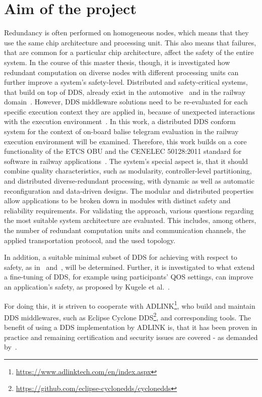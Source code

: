 \documentclass[a4paper, 12pt]{scrartcl}
\begin{document}
\section*{Aim of the project}
Redundancy is often performed on homogeneous nodes, which means that they use the same chip architecture and processing unit.
This also means that failures, that are common for a particular chip architecture, affect the safety of the entire system.
In the course of this master thesis, though, it is investigated how redundant computation on diverse nodes with different processing units can further improve a system's safety-level.
Distributed and safety-critical systems, that build on top of \ac{DDS}, already exist in the automotive~\cite{DistributedSafety2020} and in the railway domain~\cite{DDSInURail}.
However, \ac{DDS} middleware solutions need to be re-evaluated for each specific execution context they are applied in, because of unexpected interactions with the execution environment~\cite{CotroneoDDSFailureAnalysis}.
In this work, a distributed \ac{DDS} conform system for the context of on-board balise telegram evaluation in the railway execution environment will be examined.
Therefore, this work builds on a core functionality of the \ac{ETCS OBU} and the CENELEC 50128:2011 standard for software in railway applications~\cite{BoulangerStandards}.
The system's special aspect is, that it should combine quality characteristics, such as modularity, control\-ler-level partitioning, and distributed diverse-redundant processing, with dynamic as well as automatic reconfiguration and data-driven designs.
The modular and distributed properties allow applications to be broken down in modules with distinct safety and reliability requirements.
For validating the approach, various questions regarding the most suitable system architecture are evaluated.
This includes, among others, the number of redundant computation units and communication channels, the applied transportation protocol, and the used topology.

In addition, a suitable minimal subset of \ac{DDS} for achieving with respect to safety, as in~\cite{DistributedSafety2020} and~\cite{KugeleDataCentricForAuto}, will be determined.
Further, it is investigated to what extend a fine-tuning of \ac{DDS}, for example using participants' \ac{QOS} settings, can improve an application's safety, as proposed by Kugele et al.~\cite{KugeleDataCentricForAuto}.

For doing this, it is striven to cooperate with ADLINK\footnote{\url{https://www.adlinktech.com/en/index.aspx}}, who build and maintain \ac{DDS} middlewares, such as Eclipse Cyclone DDS\footnote{\url{https://github.com/eclipse-cyclonedds/cyclonedds}}, and corresponding tools.
The benefit of using a \ac{DDS} implementation by ADLINK is, that it has been proven in practice and remaining certification and security issues are covered - as demanded by~\cite{KugeleDataCentricForAuto}.
\end{document}
